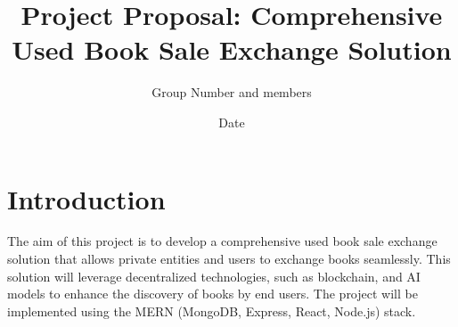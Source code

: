 \documentclass{article}
\begin{document}
\title{Project Proposal: Comprehensive Used Book Sale Exchange Solution}
\author{Group Number and members}
\date{Date}
\maketitle

\tableofcontents
\newpage

\section{Introduction}
The aim of this project is to develop a comprehensive used book sale exchange solution that allows private entities and users to exchange books seamlessly. This solution will leverage decentralized technologies, such as blockchain, and AI models to enhance the discovery of books by end users. The project will be implemented using the MERN (MongoDB, Express, React, Node.js) stack.
\end{document}
